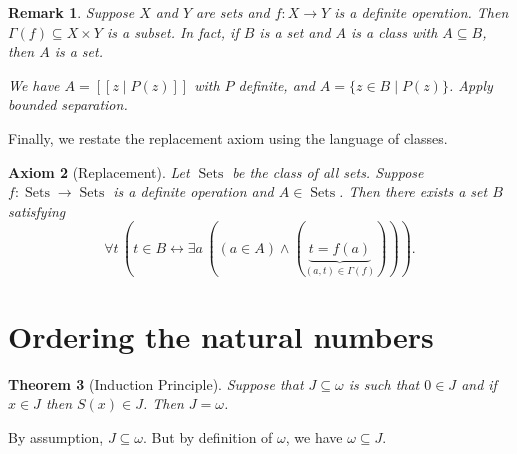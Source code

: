 \documentclass[10pt]{article}
\makeatletter
\DeclareMathOperator{\Sets}{Sets}
\theoremstyle{newstyle}
\newtheorem{thm}{Theorem}[section]
\newtheorem{remark}[thm]{Remark}
\newtheorem{axiom}[thm]{Axiom}
\newenvironment{pf}[1][\proofname]{\par
  \pushQED{\qed}%
  \normalfont \topsep0\p@\relax
  \trivlist
  \item[\hskip\labelsep\scshape
  #1\@addpunct{.}]\ignorespaces
}{%
  \popQED\endtrivlist\@endpefalse
}
\makeatother
\begin{document}
\begin{remark} 
Suppose $X$ and $Y$ are sets and $f : X \to Y$ is a definite operation. Then $\Gamma(f) \subseteq X \times Y$ is a subset. In fact, if $B$ is a set and $A$ is a class with $A \subseteq B$, then $A$ is a set. 
\begin{pf}
We have $A = [[z \mid P(z)]]$ with $P$ definite, and $A = \{z \in B \mid P(z)\}$. Apply bounded 
separation.
\end{pf}
\end{remark} 

Finally, we restate the replacement axiom using the language of classes. 

\begin{axiom}[Replacement] 
Let $\Sets$ be the class of all sets. Suppose $f : \Sets \to \Sets$ is a definite operation and 
$A \in \Sets$. Then there exists a set $B$ satisfying 
\[ \forall t \, (t \in B \leftrightarrow \exists a \, ((a \in A) \wedge (\underbrace{t = f(a)}_{(a, t) \in \Gamma(f)}))). \] 
\end{axiom}

\newpage\section{Ordering the natural numbers}

\begin{thm}[Induction Principle] 
Suppose that $J \subseteq \omega$ is such that $0 \in J$ and if $x \in J$ then $S(x) \in J$. 
Then $J = \omega$. 
\end{thm}
\begin{pf}
By assumption, $J \subseteq \omega$. But by definition of $\omega$, we have $\omega \subseteq J$.
\end{pf}
\end{document}
